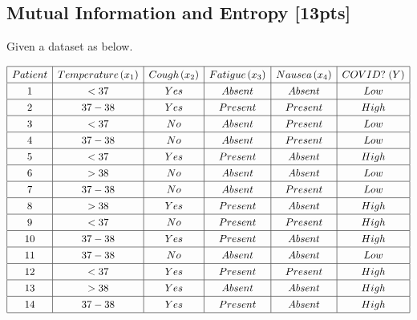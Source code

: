 \documentclass{article}
\begin{document}
\subsection{Mutual Information and Entropy [13pts]}
Given a dataset as below.
\begin{center}
$$
\renewcommand*{\arraystretch}{1.3}
\begin{array}{|c|c|c|c|c|c|}\hline Patient & Temperature \hspace{0.5mm} (x_1) & Cough \hspace{0.5mm} (x_2) & Fatigue \hspace{0.5mm} (x_3) & Nausea \hspace{0.5mm} (x_4) & COVID? \hspace{1mm} (Y) \\ \hline 1 & <37 & Yes & Absent & Absent & Low \\ \hline 2 & 37-38 & Yes & Present & Present & High \\ \hline 3 & <37 & No & Absent & Present & Low \\ \hline 4 & 37-38 & No & Absent & Present & Low \\ \hline 5 & <37 & Yes & Present & Absent & High \\ \hline 6 & >38 & No & Absent & Absent & Low \\ \hline 7 & 37-38 & No & Absent & Present & Low\\ \hline 8 & >38 & Yes & Present & Absent & High\\ \hline 9 & <37 & No & Present & Present & High\\ \hline 10 & 37-38 & Yes & Present & Absent & High\\ \hline 11 & 37-38 & No & Absent & Absent & Low \\ \hline 12 & <37 & Yes & Present & Present & High \\ \hline 13 & >38 & Yes & Absent & Absent & High \\ \hline 14 & 37-38 & Yes & Present & Absent & High \\\hline\end{array}$$
\end{center}
 
\end{document}
